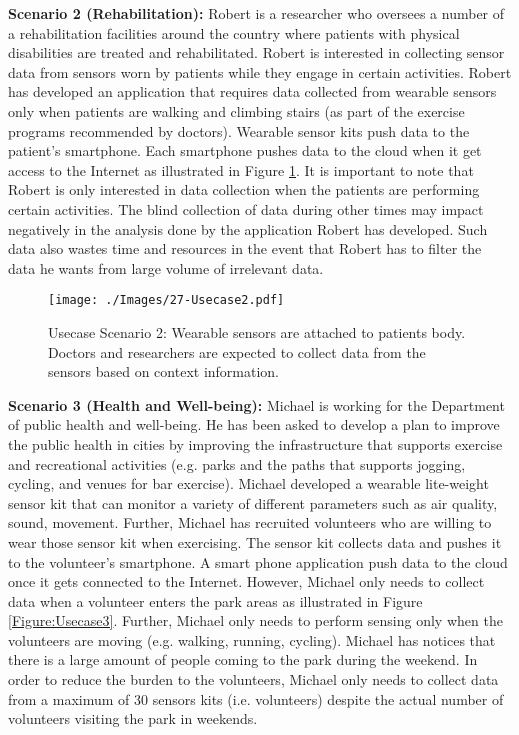 \documentclass[journal]{IEEEtran}
\begin{document}
\textbf{Scenario 2 (Rehabilitation):} Robert is a researcher who oversees a number of a rehabilitation facilities around the country where patients with physical disabilities are treated and rehabilitated. Robert is interested in collecting sensor data from sensors worn by patients while they engage in certain activities. Robert has  developed an application that requires data collected from wearable sensors \cite{bodyArea} only when patients are walking and climbing stairs (as part of the exercise programs recommended by doctors). Wearable sensor kits push data to the patient's smartphone. Each smartphone pushes data to the cloud when it get access to the Internet as illustrated in Figure \ref{Figure:Usecase2}. It is important to note that Robert is only interested in data collection  when the patients are performing certain activities. The blind collection of data during other times may impact negatively in the analysis done by the application Robert has developed. Such data also wastes time and resources in the event that Robert has to filter the data he wants from large volume of irrelevant data.


\begin{figure}[h]
 \centering
\texttt{[image: ./Images/27-Usecase2.pdf]}
\caption{Usecase Scenario 2: Wearable sensors are attached to patients body. Doctors and researchers are expected to collect data from the sensors based on context information.}
 \label{Figure:Usecase2}	
\end{figure}




\textbf{Scenario 3 (Health and Well-being):} Michael is working for the Department of public health and well-being. He has been asked to develop a plan to improve the public health  in cities by improving the infrastructure that supports  exercise and recreational activities (e.g. parks and the paths that supports jogging, cycling, and venues for bar exercise). Michael developed a wearable lite-weight sensor kit that can monitor a variety of different parameters such as air quality, sound, movement. Further, Michael has recruited volunteers who are willing to wear those sensor kit when  exercising. The sensor kit collects data and pushes it to the volunteer's smartphone. A smart phone application push data to the cloud once it gets connected to the Internet. However, Michael  only needs to collect data when a volunteer enters  the park areas as illustrated in Figure \ref{Figure:Usecase3}. Further, Michael only needs to perform sensing only when the volunteers are moving (e.g. walking, running, cycling). Michael has notices that there  is a large amount of people coming to the park during the weekend. In order to reduce the burden to the volunteers, Michael only needs to collect data from a maximum of 30 sensors  kits (i.e. volunteers) despite the actual number of volunteers visiting the park in weekends.
\end{document}
